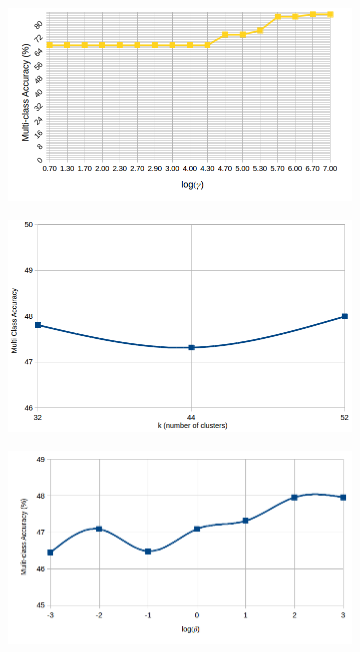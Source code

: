 \begin{figure}[!h]
\begin{subfigure}[b]{0.3\linewidth}
    \caption{}
  \end{subfigure}
    \begin{subfigure}[b]{0.3\linewidth}
    \includegraphics[width=\linewidth]{images/simple_gamma_awa}
    \caption{}
  \end{subfigure}
  \begin{subfigure}[b]{0.3\linewidth}
    \includegraphics[width=\linewidth]{images/simple_k}
    \caption{}
  \end{subfigure}
    \begin{subfigure}[b]{0.3\linewidth}
    \includegraphics[width=\linewidth]{images/simple_beta}

\end{subfigure}
\end{figure}
